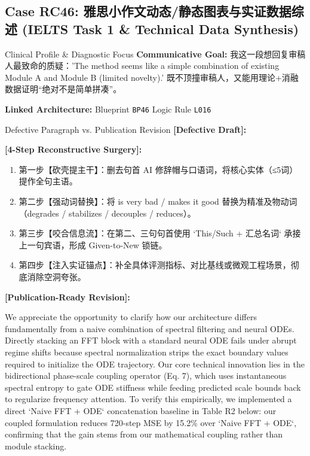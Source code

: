 \subsection{Case RC46: 雅思小作文动态/静态图表与实证数据综述 (IELTS Task 1 \& Technical Data Synthesis)}\label{case:RC46}
\begin{ConceptBox}{Clinical Profile \& Diagnostic Focus}
\textbf{Communicative Goal:} 我这一段想回复审稿人最致命的质疑：'The method seems like a simple combination of existing Module A and Module B (limited novelty).' 既不顶撞审稿人，又能用理论+消融数据证明“绝对不是简单拼凑”。\par
\textbf{Linked Architecture:} Blueprint \texttt{BP46} \enspace\textbar\enspace Logic Rule \texttt{L016}
\end{ConceptBox}
\begin{ExampleBox}{Defective Paragraph vs. Publication Revision}
\textbf{\color{TargetHighlight}[Defective Draft]:}\par
{}\par\vspace{6pt}
\textbf{\color{AcadForest}[4-Step Reconstructive Surgery]:}
\begin{enumerate}[label=\textbf{\color{AcadNavy}Step \arabic*:}, leftmargin=2em]
  \item 第一步【砍壳提主干】：删去句首 AI 修辞帽与口语词，将核心实体（≤5词）提作全句主语。
  \item 第二步【强动词替换】：将 is very bad / makes it good 替换为精准及物动词（degrades / stabilizes / decouples / reduces）。
  \item 第三步【咬合信息流】：在第二、三句句首使用 `This/Such + 汇总名词` 承接上一句宾语，形成 Given-to-New 锁链。
  \item 第四步【注入实证锚点】：补全具体评测指标、对比基线或微观工程场景，彻底消除空洞夸张。
\end{enumerate}\vspace{4pt}
\textbf{\color{AcadNavy}[Publication-Ready Revision]:}\par
We appreciate the opportunity to clarify how our architecture differs fundamentally from a naive combination of spectral filtering and neural ODEs. Directly stacking an FFT block with a standard neural ODE fails under abrupt regime shifts because spectral normalization strips the exact boundary values required to initialize the ODE trajectory. Our core technical innovation lies in the bidirectional phase-scale coupling operator (Eq. 7), which uses instantaneous spectral entropy to gate ODE stiffness while feeding predicted scale bounds back to regularize frequency attention. To verify this empirically, we implemented a direct `Naive FFT + ODE` concatenation baseline in Table R2 below: our coupled formulation reduces 720-step MSE by 15.2\% over `Naive FFT + ODE`, confirming that the gain stems from our mathematical coupling rather than module stacking.
\end{ExampleBox}
